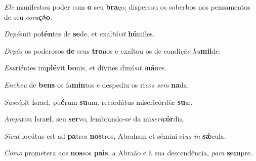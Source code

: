 \begin{greenumerate}
  \item \textit{Ele} manifestou poder com \textbf{o} seu \textbf{bra}ço: {\GreStar} dispersou os soberbos nos pensamentos de seu \textit{cora}\textbf{ção}. 

  \switchcolumn*


  \item \textit{Depó}suit po\textbf{tén}tes de \textbf{se}de, {\GreStar} et exal\textit{távit} \textbf{hú}\-miles. 

  \switchcolumn%

  \item \textit{Depôs} os poderosos \textbf{de} seus \textbf{tro}nos {\GreStar} e exaltou os de condi\textit{ção hu}\textbf{mil}de. 

  \switchcolumn*


  \item \textit{Esu}riéntes im\textbf{plé}vit \textbf{bo}nis, {\GreStar} et dívites dimí\textit{sit i}\textbf{ná}nes. 

  \switchcolumn%

  \item \textit{Encheu} de \textbf{bens} os fa\textbf{min}tos {\GreStar} e despediu os ri\textit{cos sem} \textbf{na}da. 

  \switchcolumn*


  \item \textit{Suscé}pit Israel, pu\textbf{é}rum \textbf{su}um, {\GreStar} recordátus misericór\textit{diæ} \textbf{su}æ. 

  \switchcolumn%

  \item \textit{Ampa}rou Isra\textbf{el}, seu \textbf{ser}vo, {\GreStar} lembrando-se da mi\textit{seri}\-\textbf{cór}dia. 

  \switchcolumn*


  \item \textit{Sicut} locútus est ad \textbf{pa}tres \textbf{nos}tros, {\GreStar} Abraham et sémini ei\textit{us in} \textbf{s{\'\ae}}cula. 

  \switchcolumn%

  \item \textit{Como} prometera aos \textbf{nos}sos \textbf{pais}, {\GreStar} a Abraão e à sua descendência, \textit{para} \textbf{sem}pre. 
\end{greenumerate}